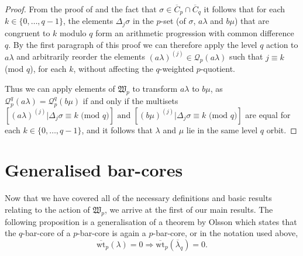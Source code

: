 \documentclass[10pt]{amsart}
\begin{document}
\begin{proof}
From the proof of \cite[Proposition 4.1]{F3} and the fact that $\sigma\in\overline{C}_p\cap\overline{C}_q$ it follows that for each $k\in\{0,\dots, q-1\}$, the elements $\Delta_j\sigma$ in the $p$-set (of $\sigma$, $a\lambda$ and $b\mu$) that are congruent to $k$ modulo $q$ form an arithmetic progression with common difference $q$. By the first paragraph of this proof we can therefore apply the level $q$ action to $a\lambda$ and arbitrarily reorder the elements $(a\lambda)^{(j)}\in\mathcal{Q}_p(a\lambda)$ such that $j\equiv k$ (mod $q$), for each $k$, without affecting the $q$-weighted $p$-quotient. 

Thus we can apply elements of $\mathfrak{W}_p$ to transform $a\lambda$ to $b\mu$, as $\mathcal{Q}^q_p(a\lambda)=\mathcal{Q}^q_p(b\mu)$ if and only if the multisets $[(a\lambda)^{(j)}|\Delta_j\sigma\equiv k\text{ (mod }q)]\text{ and }[(b\mu)^{(j)}|\Delta_j\sigma\equiv k\text{ (mod }q)]$ are equal for each $k\in\{0,\dots,q-1\}$, and it follows that $\lambda$ and $\mu$ lie in the same level $q$ orbit. 
\end{proof}

\section{Generalised bar-cores}
 
Now that we have covered all of the necessary definitions and basic results relating to the action of $\mathfrak{W}_p$, we arrive at the first of our main results. The following proposition is a generalisation of a theorem by Olsson \cite[Theorem 4]{O2} which states that the $q$-bar-core of a $p$-bar-core is again a $p$-bar-core, or in the notation used above, 
$$\overline{\text{wt}}_p(\lambda)=0\Rightarrow\overline{\text{wt}}_p(\overline{\lambda}_q)=0.$$ 
\end{document}
